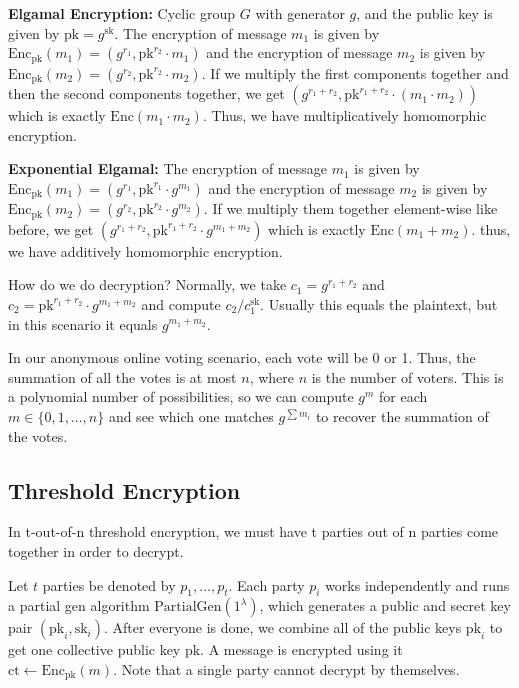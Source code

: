 \begin{example}
\textbf{Elgamal Encryption:} Cyclic group $G$ with generator $g$, and the public key is given by $\text{pk} = g^{\text{sk}}$. The encryption of message $m_1$ is given by $\text{Enc}_\text{pk}(m_1) = (g^{r_1}, \text{pk}^{r_2} \cdot m_1)$ and the encryption of message $m_2$ is given by $\text{Enc}_\text{pk}(m_2) = (g^{r_2}, \text{pk}^{r_2}\cdot m_2)$. If we multiply the first components together and then the second components together, we get $(g^{r_1 + r_2}, \text{pk}^{r_1 + r_2}\cdot (m_1 \cdot m_2))$ which is exactly $\text{Enc}(m_1 \cdot m_2)$. Thus, we have multiplicatively homomorphic encryption.

\textbf{Exponential Elgamal:} The encryption of message $m_1$ is given by $\text{Enc}_{\text{pk}} (m_1) = (g^{r_1}, \text{pk}^{r_1} \cdot g^{m_1})$ and the encryption of message $m_2$ is given by $\text{Enc}_{\text{pk}} (m_2) = (g^{r_2}, \text{pk}^{r_2} \cdot g^{m_2})$. If we multiply them together element-wise like before, we get $(g^{r_1 + r_2}, \text{pk}^{r_1 + r_2}\cdot g^{m_1 + m_2})$ which is exactly $\text{Enc}(m_1 + m_2)$. thus, we have additively homomorphic encryption.

How do we do decryption? Normally, we take $c_1 = g^{r_1 + r_2}$ and $c_2 = \text{pk}^{r_1 + r_2} \cdot g^{m_1 + m_2}$ and compute $c_2 / c_1 ^{\text{sk}}$. Usually this equals the plaintext, but in this scenario it equals $g^{m_1 + m_2}$.

In our anonymous online voting scenario, each vote will be 0 or 1. Thus, the summation of all the votes is at most $n$, where $n$ is the number of voters. This is a polynomial number of possibilities, so we can compute $g^m$ for each $m \in \{0, 1, \dots, n\}$ and see which one matches $g^{\sum m_i}$ to recover the summation of the votes.
\end{example}

\subsection{Threshold Encryption}

\begin{definition}
    In t-out-of-n threshold encryption, we must have t parties out of n parties come together in order to decrypt.
\end{definition}

Let $t$ parties be denoted by $p_1, \dots, p_t$. Each party $p_i$ works independently and runs a partial gen algorithm $\text{PartialGen}(1^{\lambda})$, which generates a public and secret key pair $(\text{pk}_i, \text{sk}_i)$. After everyone is done, we combine all of the public keys $\text{pk}_i$ to get one collective public key $\text{pk}$. A message is encrypted using it $\text{ct} \gets \text{Enc}_{\text{pk}}(m)$. Note that a single party cannot decrypt by themselves.

